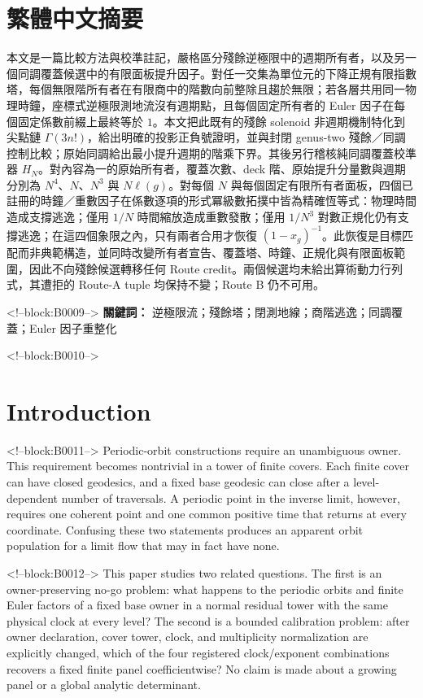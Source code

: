 \documentclass[11pt]{article}
\theoremstyle{definition}
\theoremstyle{remark}
\begin{document}
\section*{繁體中文摘要}
本文是一篇比較方法與校準註記，嚴格區分殘餘逆極限中的週期所有者，以及另一個同調覆蓋候選中的有限面板提升因子。對任一交集為單位元的下降正規有限指數塔，每個無限階所有者在有限商中的階數向前整除且趨於無限；若各層共用同一物理時鐘，座標式逆極限測地流沒有週期點，且每個固定所有者的 Euler 因子在每個固定係數前綴上最終等於 $1$。本文把此既有的殘餘 solenoid 非週期機制特化到尖點鏈 $\Gamma(3n!)$，給出明確的投影正負號證明，並與封閉 genus-two 殘餘／同調控制比較；原始同調給出最小提升週期的階乘下界。其後另行稽核純同調覆蓋校準器 $H_N$。對內容為一的原始所有者，覆蓋次數、deck 階、原始提升分量數與週期分別為 $N^4$、$N$、$N^3$ 與 $N\ell(g)$。對每個 $N$ 與每個固定有限所有者面板，四個已註冊的時鐘／重數因子在係數逐項的形式冪級數拓撲中皆為精確恆等式：物理時間造成支撐逃逸；僅用 $1/N$ 時間縮放造成重數發散；僅用 $1/N^3$ 對數正規化仍有支撐逃逸；在這四個象限之內，只有兩者合用才恢復 $(1-x_g)^{-1}$。此恢復是目標匹配而非典範構造，並同時改變所有者宣告、覆蓋塔、時鐘、正規化與有限面板範圍，因此不向殘餘候選轉移任何 Route credit。兩個候選均未給出算術動力行列式，其遭拒的 Route-A tuple 均保持不變；Route B 仍不可用。

<!--block:B0009-->
\medskip
\noindent\textbf{關鍵詞：} 逆極限流；殘餘塔；閉測地線；商階逃逸；同調覆蓋；Euler 因子重整化

<!--block:B0010-->
\section{Introduction}

<!--block:B0011-->
Periodic-orbit constructions require an unambiguous owner. This requirement becomes nontrivial in a tower of finite covers. Each finite cover can have closed geodesics, and a fixed base geodesic can close after a level-dependent number of traversals. A periodic point in the inverse limit, however, requires one coherent point and one common positive time that returns at every coordinate. Confusing these two statements produces an apparent orbit population for a limit flow that may in fact have none.

<!--block:B0012-->
This paper studies two related questions. The first is an owner-preserving no-go problem: what happens to the periodic orbits and finite Euler factors of a fixed base owner in a normal residual tower with the same physical clock at every level? The second is a bounded calibration problem: after owner declaration, cover tower, clock, and multiplicity normalization are explicitly changed, which of the four registered clock/exponent combinations recovers a fixed finite panel coefficientwise? No claim is made about a growing panel or a global analytic determinant.
\end{document}
